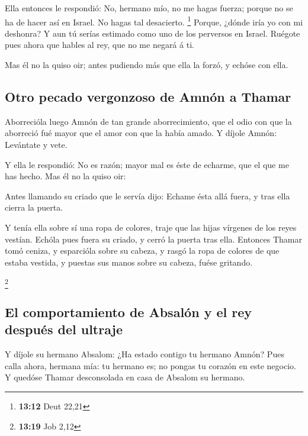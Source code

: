  Ella entonces le respondió: No, hermano mío, no me hagas
fuerza; porque no se ha de hacer así en Israel. No hagas tal desacierto.
\footnote{\textbf{13:12} Deut 22,21}  Porque, ¿dónde iría
yo con mi deshonra? Y aun tú serías estimado como uno de los perversos
en Israel. Ruégote pues ahora que hables al rey, que no me negará á ti.

 Mas él no la quiso oir; antes pudiendo más que ella la
forzó, y echóse con ella.

\hypertarget{otro-pecado-vergonzoso-de-amnuxf3n-a-thamar}{%
\subsection{Otro pecado vergonzoso de Amnón a
Thamar}\label{otro-pecado-vergonzoso-de-amnuxf3n-a-thamar}}

 Aborrecióla luego Amnón de tan grande aborrecimiento,
que el odio con que la aborreció fué mayor que el amor con que la había
amado. Y díjole Amnón: Levántate y vete.

 Y ella le respondió: No es razón; mayor mal es éste de
echarme, que el que me has hecho. Mas él no la quiso oir:

 Antes llamando su criado que le servía dijo: Echame ésta
allá fuera, y tras ella cierra la puerta.

 Y tenía ella sobre sí una ropa de colores, traje que las
hijas vírgenes de los reyes vestían. Echóla pues fuera su criado, y
cerró la puerta tras ella.  Entonces Thamar tomó ceniza,
y esparcióla sobre su cabeza, y rasgó la ropa de colores de que estaba
vestida, y puestas sus manos sobre su cabeza, fuése gritando.

\footnote{\textbf{13:19} Job 2,12}

\hypertarget{el-comportamiento-de-absaluxf3n-y-el-rey-despuuxe9s-del-ultraje}{%
\subsection{El comportamiento de Absalón y el rey después del
ultraje}\label{el-comportamiento-de-absaluxf3n-y-el-rey-despuuxe9s-del-ultraje}}

 Y díjole su hermano Absalom: ¿Ha estado contigo tu
hermano Amnón? Pues calla ahora, hermana mía: tu hermano es; no pongas
tu corazón en este negocio. Y quedóse Thamar desconsolada en casa de
Absalom su hermano.

